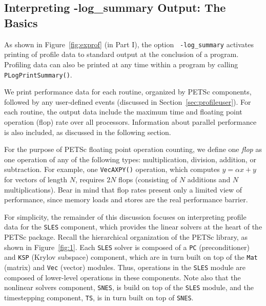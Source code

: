 {\subsection{Interpreting -log\_summary Output: The Basics}

As shown in Figure~\ref{fig:exprof} (in Part I), the option {\tt
-log\_summary}  activates printing of profile
data to standard output at the conclusion of a program.  Profiling
data can also be printed at any time within a program by calling {\tt
PLogPrintSummary()}.

We print performance data for each routine, organized by PETSc
components, followed by any user-defined events (discussed in
Section~\ref{sec:profileuser}).  For each routine, the output data
include the maximum time and floating point operation (flop) rate over
all processors.  Information about parallel performance is also
included, as discussed in the following section.

For the purpose of PETSc floating point operation counting, we define
one {\em flop} as one operation of any of the following types:
multiplication, division, addition, or subtraction.  For example, one
{\tt VecAXPY()} operation, which computes $y = \alpha x + y$ for
vectors of length $N$, requires $2N$ flops (consisting of $N$
additions and $N$ multiplications).  Bear in mind that flop rates
present only a limited view of performance, since memory loads and stores are
the real performance barrier.

For simplicity, the remainder of this discussion focuses on
interpreting profile data for the {\tt SLES} component, 
which provides the linear solvers at the heart of the
PETSc package.  Recall the hierarchical organization of the PETSc
library, as shown in Figure~\ref{fig:1}.  Each {\tt SLES} solver 
is composed of a {\tt PC} (preconditioner) and {\tt KSP} (Krylov
subspace) component, which are in turn built on top of the {\tt Mat} 
(matrix) and {\tt Vec} (vector) modules.  Thus, operations in the
{\tt SLES} module are composed of lower-level operations in these
components.  Note also that the nonlinear solvers component, {\tt SNES}, 
is build on top of the {\tt SLES} module, and the timestepping
component, {\tt TS}, is in turn built on top of {\tt SNES}.

}
